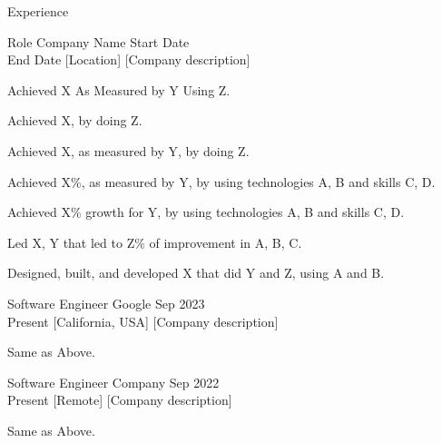 \documentclass{resume} %
\begin{document}

\begin{rSection}{Experience}
    \begin{rSubsection}
        {Role}
        {Company Name}
        {Start Date \\ End Date}
        [Location]
        [Company description] %
        \begin{rItemize}
            \item Achieved X As Measured by Y Using Z.
            \begin{rItemize}
                \item Achieved X, by doing Z.
                \item Achieved X, as measured by Y, by doing Z.
                \item Achieved X\%, as measured by Y, by using technologies A, B and skills C, D.
                \item Achieved X\% growth for Y, by using technologies A, B and skills C, D.
                \item Led X, Y that led to Z\% of improvement in A, B, C.
            \end{rItemize}
            \item Designed, built, and developed X that did Y and Z, using A and B.
        \end{rItemize}
    \end{rSubsection}

    \begin{rSubsection}
        {Software Engineer}
        {Google}
        {Sep 2023 \\ Present}
        [California, USA]
        [Company description] %
        \begin{rItemize}
            \item Same as Above.
        \end{rItemize}
    \end{rSubsection}

    \begin{rSubsection}
        {Software Engineer}
        {Company}
        {Sep 2022 \\ Present}
        [Remote]
        [Company description] %
        \begin{rItemize}
            \item Same as Above.
        \end{rItemize}
    \end{rSubsection}


\end{rSection}
\end{document}
